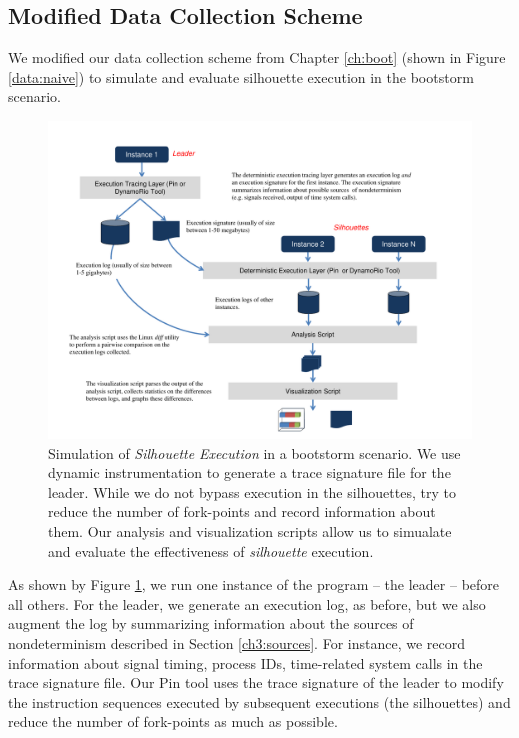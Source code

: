 \subsection{Modified Data Collection Scheme}
We modified our data collection scheme from Chapter \ref{ch:boot} 
(shown in Figure \ref{data:naive}) to simulate and
evaluate silhouette execution in the bootstorm scenario.

\begin{figure}[]
  \center
  \includegraphics[scale=0.75, trim=2cm 0cm 1cm 0cm]
                  {simulation.pdf}
  \caption[Simulation of {\em Silhouette Execution} in a bootstorm scenario]%
  {Simulation of {\em Silhouette Execution} in a bootstorm scenario.
    We use dynamic instrumentation to 
    generate a trace signature file for the leader.
    While we do not bypass execution in the 
    silhouettes, try to reduce the number of fork-points 
    and record information about them.
    Our analysis and visualization
    scripts allow us to simualate and evaluate
    the effectiveness of {\em silhouette} execution.
  }
  \label{ch3:figsimulation}
\end{figure}


As shown by Figure \ref{ch3:figsimulation}, we run one instance of the
program -- the leader -- before all others.
For the leader, we generate an execution log, as before,
but we also augment the log by summarizing information about the sources of nondeterminism
described in Section \ref{ch3:sources}. For instance, we record
information about signal timing, process IDs, time-related system calls
in the trace signature file. Our Pin tool
uses the trace signature of the leader
to modify the instruction sequences executed by subsequent
executions (the silhouettes) and reduce the number of fork-points
as much as possible.

